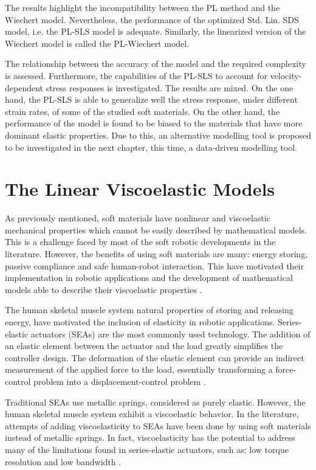 The results highlight the incompatibility between the PL method and the Wiechert model. Nevertheless, the performance of the optimized Std. Lin. SDS model, i.e. the PL-SLS model is adequate. Similarly, the linearized version of the Wiechert model is called the PL-Wiechert model.

The relationship between the accuracy of the model and the required complexity is assessed. Furthermore, the capabilities of the PL-SLS to account for velocity-dependent stress responses is investigated. The results are mixed. On the one hand, the PL-SLS is able to generalize well the stress response, under different strain rates, of some of the studied soft materials. On the other hand, the performance of the model is found to be biased to the materials that have more dominant elastic properties. Due to this, an alternative modelling tool is proposed to be investigated in the next chapter, this time, a data-driven modelling tool.

\section{The Linear Viscoelastic Models}

As previously mentioned, soft materials have nonlinear and viscoelastic mechanical properties which cannot be easily described by mathematical models. This is a challenge faced by most of the soft robotic developments in the literature. However, the benefits of using soft materials are many: energy storing, passive compliance and safe human-robot interaction. This have motivated their implementation in robotic applications and the development of mathematical models able to describe their viscoelastic properties \cite{lee2017soft}.

The human skeletal muscle system natural properties of storing and releasing energy, have motivated the inclusion of elasticity in robotic applications. Series-elastic actuators (SEAs) are the most commonly used technology. The addition of an elastic element between the actuator and the load greatly simplifies the controller design. The deformation of the elastic element can provide an indirect measurement of the applied force to the load, essentially transforming a force-control problem into a displacement-control problem \cite{agarwal2017series}. 

Traditional SEAs use metallic springs, considered as purely elastic. However, the human skeletal muscle system exhibit a viscoelastic behavior. In the literature, attempts of adding viscoelasticity to SEAs have been done by using soft materials instead of metallic springs. In fact, viscoelasticity has the potential to address many of the limitations found in series-elastic actuators, such as: low torque resolution and low bandwidth \cite{martins2015polyurethane,tagliamonte2014rendering,schepelmann2014compact}. 

